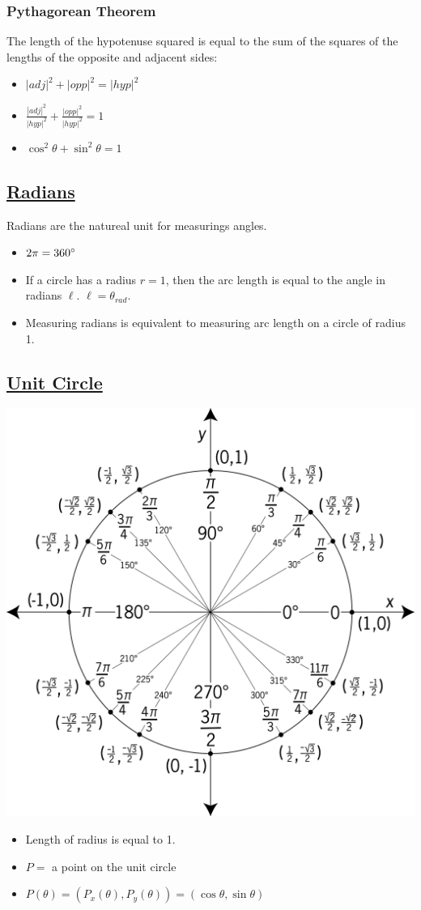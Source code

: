 \documentclass{article}
\begin{document}
\subsubsection{Pythagorean Theorem}
The length of the hypotenuse squared is equal to the sum of the squares of the lengths of the opposite and adjacent sides:
\begin{itemize}
  \item $|adj|^{2} + |opp|^{2} = |hyp|^{2}$
  \item $\frac{|adj|^{2}}{|hyp|^{2}} + \frac{|opp|^{2}}{|hyp|^{2}} = 1$
  \item $\cos^{2}\theta + \sin^{2}\theta = 1$
\end{itemize}


\subsection{\underline{Radians}}
Radians are the natureal unit for measurings angles.
\begin{itemize}
  \item $2\pi = 360\degree$
  \item If a circle has a radius $r = 1$, then the arc length is equal to the angle in radians $\ell$.  $\ell = \theta_{rad}$.
  \item Measuring radians is equivalent to measuring arc length on a circle of radius 1.
\end{itemize}

\subsection{\underline{Unit Circle}}
\includegraphics[width=\linewidth]{unitcircle1.png}
\begin{itemize}
  \item Length of radius is equal to 1.
  \item $P =$ a point on the unit circle
  \item $P(\theta) = (P_{x}(\theta), P_{y}(\theta)) = (\cos\theta, \sin\theta)$
\end{itemize}
\end{document}
